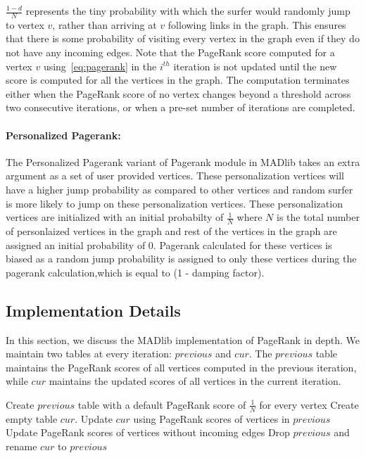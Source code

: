 $\frac{1-d}{N}$ represents the tiny probability with which the surfer
would randomly jump to vertex $v$, rather than arriving at $v$ following
links in the graph. This ensures that there is some probability of visiting
every vertex in the graph even if they do not have any incoming edges. Note
that the PageRank score computed for a vertex $v$ using~\ref{eq:pagerank}
in the $i^{th}$ iteration is not updated until the new score is computed for
all the vertices in the graph. The computation terminates either when the
PageRank score of no vertex changes beyond a threshold across two consecutive
iterations, or when a pre-set number of iterations are completed.

\paragraph{Personalized Pagerank:}
The Personalized Pagerank variant of Pagerank module in MADlib takes an extra argument as a set of user provided vertices.
These personalization vertices will have a higher jump probability as compared to other vertices and random surfer is more likely to jump on these personalization vertices. These personalization vertices are initialized with an initial probabilty of $\frac{1}{N}$ where $N$ is the total number of personlaized vertices in the graph and rest of the vertices in the graph are assigned an initial probability of 0. Pagerank calculated for these vertices is biased as a random jump probability is assigned to only these vertices during the pagerank calculation,which is equal to (1 - damping factor).

\subsection{Implementation Details} \label{sec:pagerank:implementation}

In this section, we discuss the MADlib implementation of PageRank in depth.
We maintain two tables at every iteration: $previous$ and $cur$. The
$previous$ table maintains the PageRank scores of all vertices computed in
the previous iteration, while $cur$ maintains the updated scores of all
vertices in the current iteration.

\begin{algorithm}[PageRank$(V,E)$] \label{alg:pagerank:high}
\begin{algorithmic}[1]
    \State Create $previous$ table with a default PageRank score of
            $\frac{1}{N}$ for every vertex
    \Repeat
        \State Create empty table $cur$.
        \State Update $cur$ using PageRank scores of vertices in $previous$
        \State Update PageRank scores of vertices without incoming edges
        \State Drop $previous$ and rename $cur$ to $previous$
\end{algorithmic}
\end{algorithm}

